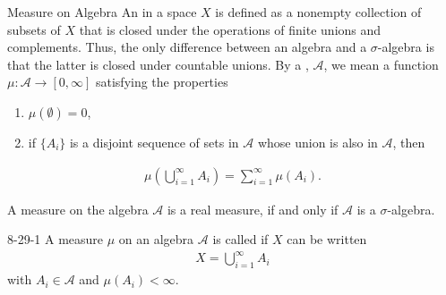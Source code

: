 \documentclass[../main.tex]{subfiles}
\begin{document}
\begin{definition}{Measure on Algebra}{}
An  in a space $X$ is defined as a nonempty collection of subsets of $X$ that is closed under the operations of finite unions and complements. Thus, the only difference between an algebra and a $\sigma$-algebra is that the latter is closed under countable unions. By a , $\mathcal{A}$, we mean a function $\mu: \mathcal{A} \to [0, \infty]$ satisfying the properties
\begin{enumerate}
    \item[(i)] $\mu(\emptyset) = 0$,
    \item[(ii)] if $\{A_i\}$ is a disjoint sequence of sets in $\mathcal{A}$ whose union is also in $\mathcal{A}$, then
\end{enumerate}
\[\begin{aligned}
\mu\left(\bigcup_{i=1}^{\infty} A_i\right) = \sum_{i=1}^{\infty} \mu(A_i).
\end{aligned}\]
\end{definition}

\begin{remark}
    A measure on the algebra \(  \mathcal{A}  \) is a  real measure, if and only if  \(  \mathcal{A}  \) is a \(   \sigma   \)-algebra.  
\end{remark}

\begin{definition}{}{8-29-1}
 A measure \(  \mu   \)  on an algebra $\mathcal{A}$ is called  if $X$ can be written
\[\begin{aligned}
X = \bigcup_{i=1}^{\infty} A_i
\end{aligned}\]
with $A_i \in \mathcal{A}$ and $\mu(A_i) < \infty$.
\end{definition}
\end{document}
